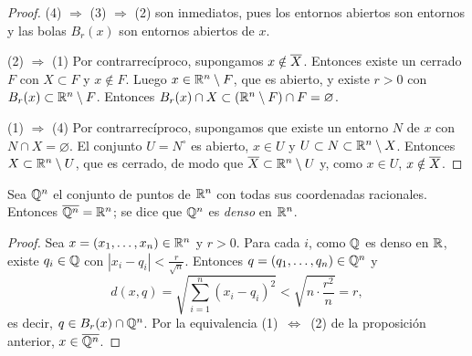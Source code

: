 \begin{proof}
  (4) \(\Rightarrow\) (3) \(\Rightarrow\) (2) son inmediatos, pues los entornos abiertos son entornos y las bolas \(B_r(x)\) son entornos abiertos de \(x\).

  (2) \(\Rightarrow\) (1) Por contrarrecíproco, supongamos \(x \notin \overline{X}\). Entonces existe un cerrado \(F\) con \(X \subset F\) y \(x \notin F\). Luego \(x \in \mathbb{R}^n \setminus F\), que es abierto, y existe \(r > 0\) con \(B_r(x) \subset \mathbb{R}^n \setminus F\). Entonces \(B_r(x) \cap X \subset (\mathbb{R}^n \setminus F) \cap F = \varnothing\).

  (1) \(\Rightarrow\) (4) Por contrarrecíproco, supongamos que existe un entorno \(N\) de \(x\) con \(N \cap X = \varnothing\). El conjunto \(U = N^{\circ}\) es abierto, \(x \in U\) y \(U \subset N \subset \mathbb{R}^n \setminus X\). Entonces \(X \subset \mathbb{R}^n \setminus U\), que es cerrado, de modo que \(\overline{X} \subset \mathbb{R}^n \setminus U\) y, como \(x \in U\), \(x \notin \overline{X}\).
\end{proof}

\begin{eg}
  Sea \(\mathbb{Q}^n\) el conjunto de puntos de \(\mathbb{R}^n\) con todas sus coordenadas racionales. Entonces \(\overline{\mathbb{Q}^n} = \mathbb{R}^n\); se dice que \(\mathbb{Q}^n\) es \emph{denso} en \(\mathbb{R}^n\).
\end{eg}

\begin{proof}
  Sea \(x = (x_1, \dots, x_n) \in \mathbb{R}^n\) y \(r > 0\). Para cada \(i\), como \(\mathbb{Q}\) es denso en \(\mathbb{R}\), existe \(q_i \in \mathbb{Q}\) con \(|x_i - q_i| < \frac{r}{\sqrt{n}}\). Entonces \(q = (q_1, \dots, q_n) \in \mathbb{Q}^n\) y
  \[
    d(x, q) = \sqrt{\sum_{i=1}^{n} {(x_i - q_i)}^2} < \sqrt{n \cdot \frac{r^2}{n}} = r,
  \]
  es decir, \(q \in B_r(x) \cap \mathbb{Q}^n\). Por la equivalencia (1)~\(\Leftrightarrow\)~(2) de la proposición anterior, \(x \in \overline{\mathbb{Q}^n}\).
\end{proof}
